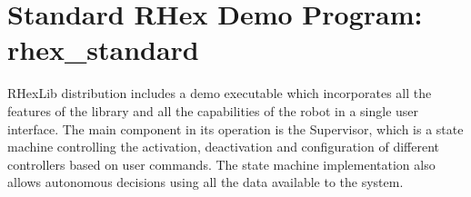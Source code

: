 %
%
% 
% 
% 
% 
% 

%
%

\chapter{Standard RHex Demo Program: rhex\_standard}
\label{sec:demo_executable}

RHexLib distribution includes a demo executable which incorporates all the
features of the library and all the capabilities of the robot in a single
user interface. The main component in its operation is the {\rm Supervisor}, 
which is a state machine controlling the activation, deactivation and
configuration of different controllers based on user commands. The state
machine implementation also allows autonomous decisions using all the data
available to the system.

